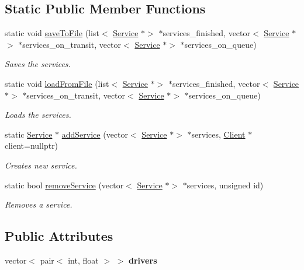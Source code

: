 \subsection*{Static Public Member Functions}
\begin{DoxyCompactItemize}
\item 
static void \hyperlink{class_service_aa3672a3a070ca951f5b66075a5d4c339}{save\+To\+File} (list$<$ \hyperlink{class_service}{Service} $\ast$$>$ $\ast$services\+\_\+finished, vector$<$ \hyperlink{class_service}{Service} $\ast$$>$ $\ast$services\+\_\+on\+\_\+transit, vector$<$ \hyperlink{class_service}{Service} $\ast$$>$ $\ast$services\+\_\+on\+\_\+queue)
\begin{DoxyCompactList}\small\item\em Saves the services. \end{DoxyCompactList}\item 
static void \hyperlink{class_service_add72b2a9e781bdb20a26bdff39952088}{load\+From\+File} (list$<$ \hyperlink{class_service}{Service} $\ast$$>$ $\ast$services\+\_\+finished, vector$<$ \hyperlink{class_service}{Service} $\ast$$>$ $\ast$services\+\_\+on\+\_\+transit, vector$<$ \hyperlink{class_service}{Service} $\ast$$>$ $\ast$services\+\_\+on\+\_\+queue)
\begin{DoxyCompactList}\small\item\em Loads the services. \end{DoxyCompactList}\item 
static \hyperlink{class_service}{Service} $\ast$ \hyperlink{class_service_a9e1aa933d52a23d5e265666bdedea0f1}{add\+Service} (vector$<$ \hyperlink{class_service}{Service} $\ast$$>$ $\ast$services, \hyperlink{class_client}{Client} $\ast$client=nullptr)
\begin{DoxyCompactList}\small\item\em Creates new service. \end{DoxyCompactList}\item 
static bool \hyperlink{class_service_af2ca48ced14708abeb5f92f10245241c}{remove\+Service} (vector$<$ \hyperlink{class_service}{Service} $\ast$$>$ $\ast$services, unsigned id)
\begin{DoxyCompactList}\small\item\em Removes a service. \end{DoxyCompactList}\end{DoxyCompactItemize}
\subsection*{Public Attributes}
\begin{DoxyCompactItemize}
\item 
\mbox{\label{class_service_ae385168a04605dc7f0aae92c2ee984ec}} 
vector$<$ pair$<$ int, float $>$ $>$ {\bfseries drivers}
\end{DoxyCompactItemize}
